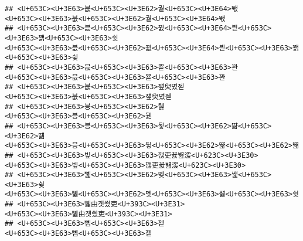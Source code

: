 \documentclass[]{article}
\begin{document}
\begin{verbatim}
## <U+653C><U+3E63>븞<U+653C><U+3E62>궡<U+653C><U+3E64>뙋                                                                                                                                                     <U+653C><U+3E63>븞<U+653C><U+3E62>궡<U+653C><U+3E64>뙋
## <U+653C><U+3E63>븞<U+653C><U+3E62>뀞<U+653C><U+3E64>븯<U+653C><U+3E63>꽭<U+653C><U+3E63>슂                                                                                                     <U+653C><U+3E63>븞<U+653C><U+3E62>뀞<U+653C><U+3E64>븯<U+653C><U+3E63>꽭<U+653C><U+3E63>슂
## <U+653C><U+3E63>븞<U+653C><U+3E63>뿉<U+653C><U+3E63>꽌                                                                                                                                                     <U+653C><U+3E63>븞<U+653C><U+3E63>뿉<U+653C><U+3E63>꽌
## <U+653C><U+3E63>븞<U+653C><U+3E63>쟾臾몄젣                                                                                                                                                                 <U+653C><U+3E63>븞<U+653C><U+3E63>쟾臾몄젣
## <U+653C><U+3E63>븡<U+653C><U+3E62>뒗                                                                                                                                                                             <U+653C><U+3E63>븡<U+653C><U+3E62>뒗
## <U+653C><U+3E63>븡<U+653C><U+3E63>뒿<U+653C><U+3E62>땲<U+653C><U+3E62>떎                                                                                                                             <U+653C><U+3E63>븡<U+653C><U+3E63>뒿<U+653C><U+3E62>땲<U+653C><U+3E62>떎
## <U+653C><U+3E63>빞<U+653C><U+3E63>깮吏꾨뱶湲<U+623C><U+3E30>                                                                                                                                         <U+653C><U+3E63>빞<U+653C><U+3E63>깮吏꾨뱶湲<U+623C><U+3E30>
## <U+653C><U+3E63>뼱<U+653C><U+3E62>몢<U+653C><U+3E63>썙<U+653C><U+3E63>슂                                                                                                                             <U+653C><U+3E63>뼱<U+653C><U+3E62>몢<U+653C><U+3E63>썙<U+653C><U+3E63>슂
## <U+653C><U+3E63>뼱由곗씠吏<U+393C><U+3E31>                                                                                                                                                                 <U+653C><U+3E63>뼱由곗씠吏<U+393C><U+3E31>
## <U+653C><U+3E63>뼵<U+653C><U+3E63>젣                                                                                                                                                                             <U+653C><U+3E63>뼵<U+653C><U+3E63>젣

\end{verbatim}
\end{document}
